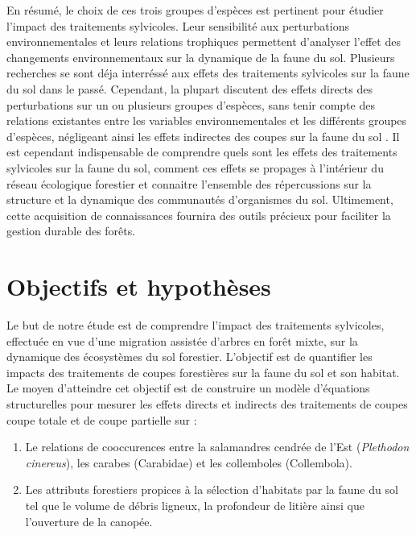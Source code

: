 En résumé, le choix de ces trois groupes d'espèces est pertinent pour étudier l'impact des traitements sylvicoles. 
Leur sensibilité aux perturbations environnementales et leurs relations trophiques permettent d'analyser l'effet des changements environnementaux sur la dynamique de la faune du sol.
Plusieurs recherches se sont déja interréssé aux effets des traitements sylvicoles sur la faune du sol dans le passé. 
Cependant, la plupart discutent des effets directs des perturbations sur un ou plusieurs groupes d'espèces, 
sans tenir compte des relations existantes entre les variables environnementales et les différents groupes d'espèces, 
négligeant ainsi les effets indirectes des coupes sur la faune du sol \citep{josephIntegratingOccupancyModels2016,Kudrin2023metaanalysiseffects,Pollierer2021Diversityfunctional}. 
Il est cependant indispensable de comprendre quels sont les effets des traitements sylvicoles sur la faune du sol, 
comment ces effets se propages à l'intérieur du réseau écologique forestier et connaitre l'ensemble des répercussions sur la structure 
et la dynamique des communautés d'organismes du sol. 
Ultimement, cette acquisition de connaissances fournira des outils précieux pour faciliter la gestion durable des forêts.


\section*{Objectifs et hypothèses}
\label{sec:objectifs}

Le but de notre étude est de comprendre l'impact des traitements sylvicoles, effectuée en vue d'une migration assistée d'arbres en forêt mixte, sur la dynamique des écosystèmes du sol forestier.
L'objectif est de quantifier les impacts des traitements de coupes forestières sur la faune du sol et son habitat. 
Le moyen d'atteindre cet objectif est de construire un modèle d'équations structurelles pour mesurer les effets directs et indirects des traitements de coupes coupe totale et de coupe partielle sur : 

\begin{enumerate}
    \item Le relations de cooccurences entre la salamandres cendrée de l'Est (\textit{Plethodon cinereus}), les carabes (Carabidae) et les collemboles (Collembola).
    \item Les attributs forestiers propices à la sélection d'habitats par la faune du sol tel que le volume de débris ligneux, la profondeur de litière ainsi que l'ouverture de la canopée. 
\end{enumerate}

